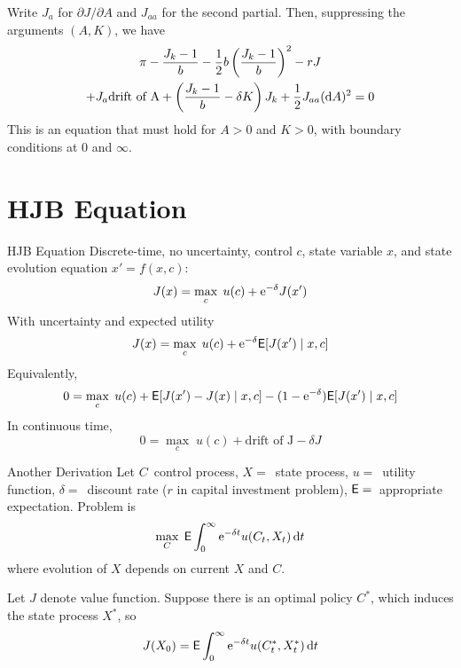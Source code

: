 \documentclass[xcolor=dvipsnames,10pt]{beamer}
\begin{document}
\begin{frame}
 

Write $J_a$ for $\partial J/\partial A$ and $J_{aa}$ for the second partial.  Then, suppressing the arguments $(A,K)$, we have
\begin{multline*}
    \pi - \frac{J_k-1}{b} - \frac{1}{2}b\left(\frac{J_k-1}{b}\right)^2 - rJ \\+J_a \text{drift of A} + \left(\frac{J_k-1}{b} - \delta K\right)J_k + \frac{1}{2}J_{aa}(\mathrm{d} A)^2 = 0
\end{multline*}
This is an equation that must hold for $A>0$ and $K >0$, with boundary conditions at 0 and $\infty$.
\end{frame}

\section{HJB Equation}
\begin{frame}{HJB Equation}
Discrete-time, no uncertainty, control $c$, state variable $x$, and state evolution equation $x' = f(x,c)$:
$$J(x) = \max_c \; u(c) + \mathrm{e}^{-\delta} J(x')$$
With uncertainty and expected utility
$$J(x) = \max_c \; u(c) + \mathrm{e}^{-\delta} \mathsf{E}[J(x') \mid x,c]$$
Equivalently,
$$0 = \max_c \; u(c) + \mathsf{E}[J(x')-J(x) \mid x,c] - (1-\mathrm{e}^{-\delta})\mathsf{E}[J(x') \mid x,c]$$
In continuous time,
$$0 = \max_c \; u(c) + \text{drift of J} - \delta J$$
\end{frame}

\begin{frame}{Another Derivation}
    Let $C\,$ control process, $X=\,$ state process, $u=\,$ utility function, $\delta=\,$ discount rate ($r$ in capital investment problem), $\mathsf{E}=\,$ appropriate expectation.  Problem is
    $$\max_C\; \mathsf{E} \int_0^\infty \mathrm{e}^{-\delta t}u(C_t,X_t)\,\mathrm{d} t$$
    where evolution of $X$ depends on current $X$ and $C$.
    
    Let $J$ denote value function.
    Suppose there is an optimal policy $C^*$, which induces the state process $X^*$, so
      $$J(X_0) = \mathsf{E} \int_0^\infty \mathrm{e}^{-\delta t}u(C^*_t,X^*_t)\,\mathrm{d} t$$
      \end{frame}
      
\end{document}
